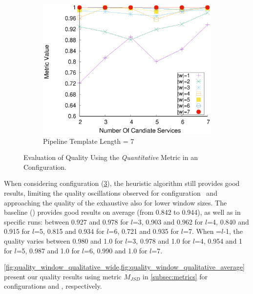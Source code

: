 \begin{figure}[ht!]
\begin{subfigure}{0.49\textwidth}
        \label{fig:quality_window_average_perce_n6}
      \end{subfigure}
      \hfill
      \begin{subfigure}{0.49\textwidth}
        \includegraphics[width=\textwidth]{Images/graphs/window_quality_performance_diff_perce_n7_s7_50_89_n7}
        \caption{Pipeline Template Length = 7}
        \label{fig:quality_window_average_perce_n7}
      \end{subfigure}


      \caption{Evaluation of Quality Using the \emph{Quantitative} Metric in an \average Configuration.}  \label{fig:quality_window_perce_average}

    \end{figure}

    When considering configuration \average (\cref{fig:quality_window_perce_average}), the heuristic algorithm still provides good results, limiting the quality oscillations observed for configuration \wide\ and approaching the quality of the exhaustive also for lower window sizes. The baseline () provides good results on average (from 0.842 to 0.944), as well as in specific runs: between 0.927 and 0.978 for $l$=3, 0.903 and 0.962 for $l$=4, 0.840 and 0.915 for $l$=5, 0.815 and 0.934 for $l$=6, 0.721 and 0.935 for $l$=7.
    When \windowsize=$l$-1, the quality varies between 0.980 and 1.0 for $l$=3, 0.978 and 1.0 for $l$=4, 0.954 and 1 for $l$=5, 0.987 and 1.0 for $l$=6, 0.990 and 1.0 for $l$=7.

    \cref{fig:quality_window_qualitative_wide,fig:quality_window_qualitative_average} {\color{OurColor2}present} our quality results using metric $M_{JSD}$ in \cref{subsec:metrics} for configurations \wide and \average, respectively.


